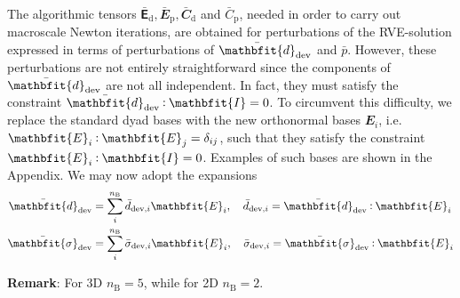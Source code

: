 \documentclass[10pt,a4paper,fleqn]{article}
\renewcommand{\ts}[1]{\mathbfit{#1}}
\renewcommand{\tf}[1]{\mathbfsfup{#1}}
\newcommand{\ded}{\mathrm{d}}
\newcommand{\dep}{\mathrm{p}}
\begin{document}
The algorithmic tensors $\bar{\tf{E}}_\ded, \bar{\ts E }_\dep, \bar{\ts C}_\ded$ and $\bar{C}_\dep$, needed in order to carry out macroscale Newton iterations, are obtained for
perturbations of the RVE-solution expressed in terms of perturbations of $\bar{\ts d}_\dev$ and $\bar{p}$. However, these perturbations are not entirely straightforward since the components of $\bar{\ts d}_\dev$ are not all independent. In fact, they must satisfy the constraint $\bar{\ts d}_\dev\dprod{\ts I}=0$. To circumvent this difficulty, we replace the standard dyad bases with the new orthonormal bases $\ts E_i$, i.e. $\ts E_i \dprod \ts E_j = \delta_{ij}$, such that they satisfy the constraint $\ts E_i\dprod{\ts I}=0$. Examples of such bases are shown in the Appendix. We may now adopt the expansions
\begin{align}
 \bar{\ts d}_\dev &= \sum_i^{n_{\mathrm{B}}} \bar{d}_{\dev,i} \ts E_i,\quad  \bar{d}_{\dev,i} = \bar{\ts d}_\dev\dprod \ts E_i
\label{eq:901} \\
 \bar{\ts\sigma}_\dev &= \sum_i^{n_{\mathrm{B}}} \bar{\sigma}_{\dev,i} \ts E_i,\quad \bar{\sigma}_{\dev,i} = \bar{\ts\sigma}_\dev\dprod \ts E_i
\label{eq:902}
\end{align}

\textbf{Remark}: For 3D $n_{\mathrm{B}} = 5$, while for 2D $n_{\mathrm{B}} = 2$.
\end{document}
